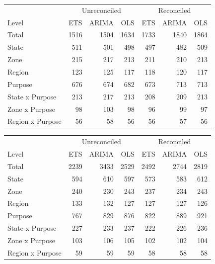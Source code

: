 \documentclass[11pt,a4paper,]{article}
\let\origtable\table
\let\endorigtable\endtable
\renewenvironment{table}[1][2] {
    \expandafter\origtable\expandafter[!htbp]
} {
    \endorigtable
}
\begin{document}
\begin{table}[!h]

\caption{\label{tab:Tourismdataresulrolling}Mean(RMSE) on 2 year test set for ETS, ARIMA and OLS with and without reconciliation - Rolling origin - Tourism dataset.}
\centering
\begin{tabular}[t]{lrrrrrr}
\toprule
\multicolumn{1}{c}{} & \multicolumn{3}{c}{Unreconciled} & \multicolumn{3}{c}{Reconciled} \\
\cmidrule(l{3pt}r{3pt}){2-4} \cmidrule(l{3pt}r{3pt}){5-7}
Level & ETS & ARIMA & OLS & ETS & ARIMA & OLS\\
\midrule
Total & 1516 & 1504 & 1634 & 1733 & 1840 & 1864\\
State & 511 & 501 & 498 & 497 & 482 & 509\\
Zone & 215 & 217 & 213 & 211 & 210 & 213\\
Region & 123 & 125 & 117 & 118 & 120 & 117\\
Purpose & 676 & 674 & 682 & 673 & 713 & 713\\
State x Purpose & 213 & 217 & 213 & 208 & 209 & 213\\
Zone x Purpose & 98 & 103 & 98 & 96 & 99 & 97\\
Region x Purpose & 56 & 58 & 56 & 56 & 57 & 56\\
\bottomrule
\end{tabular}
\end{table}

\begin{table}

\caption{\label{tab:TourismdataresultRMSE}Mean(RMSE) on 2 year test set for ETS, ARIMA and OLS with and without reconciliation - Fixed origin - Tourism dataset.}
\centering
\begin{tabular}[t]{lrrrrrr}
\toprule
\multicolumn{1}{c}{} & \multicolumn{3}{c}{Unreconciled} & \multicolumn{3}{c}{Reconciled} \\
\cmidrule(l{3pt}r{3pt}){2-4} \cmidrule(l{3pt}r{3pt}){5-7}
Level & ETS & ARIMA & OLS & ETS & ARIMA & OLS\\
\midrule
Total & 2239 & 3433 & 2529 & 2492 & 2744 & 2819\\
State & 594 & 610 & 597 & 573 & 583 & 612\\
Zone & 240 & 230 & 243 & 237 & 234 & 243\\
Region & 133 & 132 & 127 & 127 & 127 & 126\\
Purpose & 767 & 829 & 876 & 822 & 889 & 921\\
State x Purpose & 227 & 233 & 237 & 222 & 226 & 236\\
Zone x Purpose & 103 & 106 & 105 & 102 & 102 & 104\\
Region x Purpose & 59 & 59 & 59 & 58 & 58 & 58\\
\bottomrule
\end{tabular}
\end{table}
\end{document}
